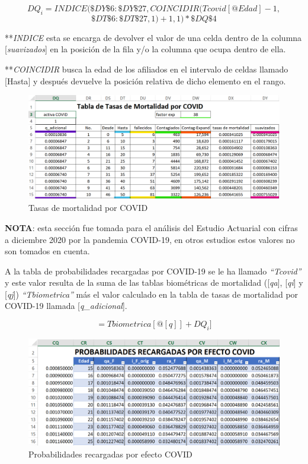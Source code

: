 \documentclass[
  letterpaper,
  DIV=11,
  numbers=noendperiod]{scrreprt}
\begin{document}
\[DQ_i=INDICE(\$DY\$6:\$DY\$27,COINCIDIR(Tcovid[@Edad]-1,\]
\[\$DT\$6:\$DT\$27,1)+1,1)*\$DQ\$4\]

**\emph{INDICE} esta se encarga de devolver el valor de una celda dentro
de la columna {[}\emph{suavizados}{]} en la posición de la fila y/o la
columna que ocupa dentro de ella.

**\emph{COINCIDIR} busca la edad de los afiliados en el intervalo de
celdas llamado {[}Hasta{]} y después devuelve la posición relativa de
dicho elemento en el rango.

\begin{figure}

{\centering \includegraphics[width=7.52083in,height=\textheight]{images/F/Img11.png}

}

\caption{Tasas de mortalidad por COVID}

\end{figure}

\textbf{NOTA}: esta sección fue tomada para el análisis del Estudio
Actuarial con cifras a diciembre 2020 por la pandemia COVID-19, en otros
estudios estos valores no son tomados en cuenta.

A la tabla de probabilidades recargadas por COVID-19 se le ha llamado
\emph{``Tcovid''} y este valor resulta de la suma de las tablas
biométricas de mortalidad ({[}\emph{qa}{]}, {[}\emph{qi}{]} y
{[}\emph{qj}{]}) \emph{``Tbiometrica''} más el valor calculado en la
tabla de tasas de mortalidad por COVID-19 llamada
{[}\emph{q\_adicional}{]}.

\[=Tbiometrica[@[q]]+DQ_i]\]

\begin{figure}

{\centering \includegraphics{images/F/Img12.png}

}

\caption{Probabilidades recargadas por efecto COVID}

\end{figure}
\end{document}
